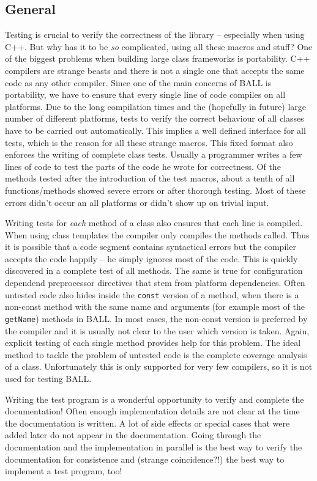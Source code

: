 \documentclass[a4paper,10pt]{article}
\begin{document}
\subsection{General}

Testing is crucial to verify the correctness of the library -- especially when
using C++. But why has it to be {\em so} complicated, using all these macros
and stuff? One of the biggest problems when building large class frameworks is
portability. C++ compilers are strange beasts and there is not a single one
that accepts the same code as any other compiler. Since one of the main
concerns of BALL is portability, we have to ensure that every single line of
code compiles on all platforms. Due to the long compilation times and the
(hopefully in future) large number of different platforms, tests to verify the
correct behaviour of all classes have to be carried out automatically. This
implies a well defined interface for all tests, which is the reason for all
these strange macros. This fixed format also enforces the writing of complete
class tests. Usually a programmer writes a few lines of code to test the parts
of the code he wrote for correctness. Of the methods tested after the
introduction of the test macros, about a tenth of all functions/methods showed
severe errors or after thorough testing. Most of these errors didn't occur an
all platforms or didn't show up on trivial input.

Writing tests for {\em each} method of a class also ensures that each line is
compiled. When using class templates the compiler only compiles the methods
called. Thus it is possible that a code segment contains syntactical errors
but the compiler accepts the code happily -- he simply ignores most of the
code. This is quickly discovered in a complete test of all methods. The same
is true for configuration dependend preprocessor directives that stem from
platform dependencies. Often untested code also hides inside the {\tt const}
version of a method, when there is a non-const method with the same name and
arguments (for example most of the {\tt getName}) methods in BALL. In most
cases, the non-const version is preferred by the compiler and it is usually
not clear to the user which version is taken. Again, explicit testing of each
single method provides help for this problem.
The ideal method to tackle the problem of untested code is the complete
coverage analysis of a class. Unfortunately this is only supported for very
few compilers, so it is not used for testing BALL.

Writing the test program is a wonderful opportunity to verify and complete the
documentation! Often enough implementation details are not clear at the time
the documentation is written. A lot of side effects or special cases that were
added later do not appear in the documentation. Going through the
documentation and the implementation in parallel is the best way to verify the
documentation for consistence and (strange coincidence?!) the best way to
implement a test program, too!
\end{document}
